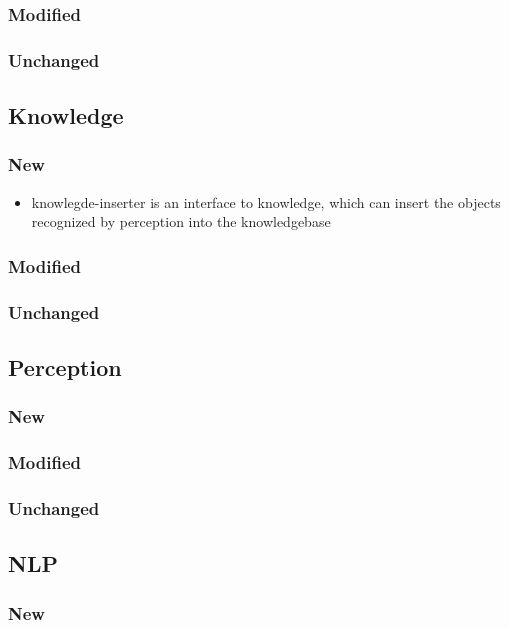 \documentclass[main.tex]{subfiles}
\begin{document}
                \subsubsection{Modified}
                \subsubsection{Unchanged}
                \subsection{Knowledge}
                \subsubsection{New}
                \begin{itemize}
 				 \item knowlegde-inserter is an interface to knowledge, which can insert the objects recognized by perception into the knowledgebase
				\end{itemize}
                \subsubsection{Modified}
                \subsubsection{Unchanged}
                \subsection{Perception}
                \subsubsection{New}
                \subsubsection{Modified}
                \subsubsection{Unchanged}
                \subsection{NLP}
                \subsubsection{New}
\end{document}

